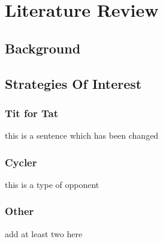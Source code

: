 
\chapter{Literature Review}\label{ch:literature}
    \section{Background}
    \section{Strategies Of Interest}
        \subsection{Tit for Tat}
        this is a sentence which has been changed\cite{Example}
        \subsection{Cycler}
        this is a type of opponent
        \subsection{Other}
        add at least two here
